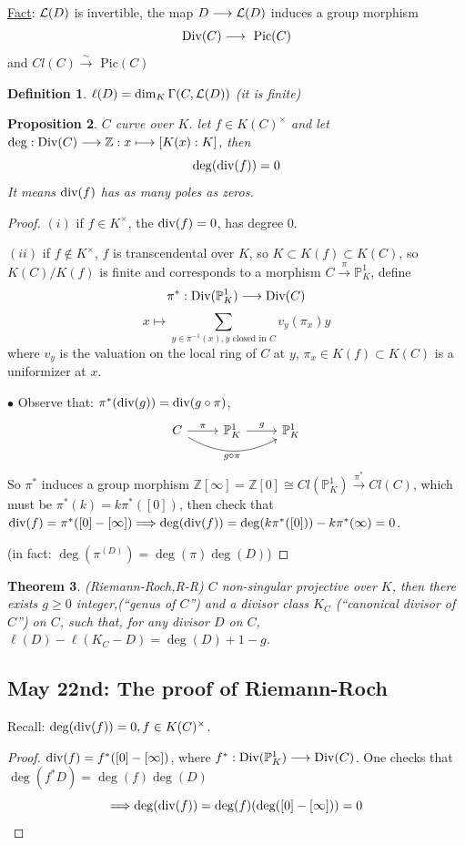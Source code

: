 \documentclass[11pt]{article}
\newtheorem{thm}{Theorem}[section]
\newtheorem{prop}[thm]{Proposition}
\newtheorem{dfn}[thm]{Definition}
\newcommand{\pic}{\text{ Pic}}
\newcommand{\proj}{\mathbb P}
\newcommand{\intg}{\mathbb Z}
\newcommand{\call}{{\cal L}}
\renewcommand{\div}{\textnormal{div}}
\newcommand{\Div}{\textnormal{Div}}
\newcommand{\Lrta}{\Longrightarrow}
\newcommand{\lrta}{\longrightarrow}
\begin{document}
\underline{Fact}: $\call(D)$ is invertible, the map $D\lrta\call(D)$ induces a group morphism
$$
\Div(C)\lrta\pic(C)
$$
and $Cl(C)\overset{\sim}{\lrta}\pic(C)$
\begin{dfn}
$\ell(D)=\dim_K\Gamma(C,\call(D))$ (it is finite)
\end{dfn}
\begin{prop}
$C$ curve over $K$. let $f\in K(C)^\times$ and let $\deg:\Div(C)\lrta \intg: x\longmapsto[K(x):K]$, then
$$
\deg(\div(f))=0
$$
It means $\div(f)$ has as many poles as zeros.
\end{prop}
\begin{proof}
$(i)$ if $f\in K^\times$, the $\div(f)=0$, has degree $0$.

$(ii)$ if $f\notin K^\times$, $f$ is transcendental over $K$, so $K\subset K(f)\subset K(C)$, so $K(C)/K(f)$ is finite and corresponds to a morphism
$C\overset{\pi}{\lrta}\proj^1_K$, define 
$$
\pi^*: \Div(\proj^1_K)\lrta \Div(C)
$$
$$
x\longmapsto \sum_{y\in \pi^{-1}(x), y\text{ closed in }C} v_y(\pi_x)y
$$
where $v_y$ is the valuation on the local ring of $C$ at $y$, $\pi_x\in K(f)\subset K(C)$ is a uniformizer at $x$.

$\bullet$ Observe that: $\pi^*(\div(g))=\div(g\circ \pi)$, 
$$
\begin{tikzcd}
C \arrow[r, "\pi"] \arrow[rr, "g\circ\pi"', bend right] & \proj^1_K \arrow[r, "g"] & \proj^1_K
\end{tikzcd}
$$
So $\pi^*$ induces a group morphism $\intg[\infty]=\intg[0]\cong Cl(\proj^1_K)\overset{\pi^*}{\lrta}Cl(C)$, which must be $\pi^*(k)=k\pi^*([0])$, then check that $\div(f)=\pi^*([0]-[\infty])\Lrta \deg(\div(f))=\deg(k\pi^*([0]))-k\pi^*(\infty)=0$.

(in fact: $\deg(\pi^(D))=\deg(\pi)\deg(D)$)
\end{proof}
\begin{thm}
(Riemann-Roch,R-R) $C$ non-singular projective over $K$, then there exists $g\geq 0$ integer,(``genus of $C$'') and a divisor class $K_C$ (``canonical divisor of $C$'') on $C$, such that, for any divisor $D$ on $C$, $\ell(D)-\ell(K_C-D)=\deg(D)+1-g$.
\end{thm}
\subsection{May 22nd: The proof of Riemann-Roch}
Recall: $\deg(\div(f))=0, f\in K(C)^\times$.
\begin{proof}
$\div(f)=f^*([0]-[\infty])$, where $f^*: \Div(\proj^1_K)\lrta \Div(C)$. One checks that $\deg(f^*D)=\deg (f)\deg(D)$
$$
\Lrta \deg(\div(f))=\deg(f)(\deg([0]-[\infty]))=0
$$
\end{proof}
\end{document}
